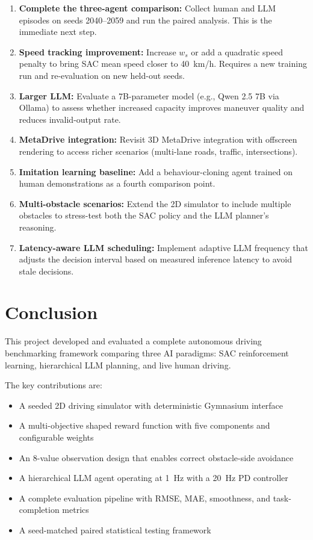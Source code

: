 \documentclass[12pt,a4paper]{report}
\begin{document}
\begin{enumerate}
  \item \textbf{Complete the three-agent comparison:} Collect human and LLM episodes on seeds 2040--2059 and run the paired analysis. This is the immediate next step.

  \item \textbf{Speed tracking improvement:} Increase $w_s$ or add a quadratic speed penalty to bring SAC mean speed closer to 40~km/h. Requires a new training run and re-evaluation on new held-out seeds.

  \item \textbf{Larger LLM:} Evaluate a 7B-parameter model (e.g., Qwen 2.5 7B via Ollama) to assess whether increased capacity improves maneuver quality and reduces invalid-output rate.

  \item \textbf{MetaDrive integration:} Revisit 3D MetaDrive integration with offscreen rendering to access richer scenarios (multi-lane roads, traffic, intersections).

  \item \textbf{Imitation learning baseline:} Add a behaviour-cloning agent trained on human demonstrations as a fourth comparison point.

  \item \textbf{Multi-obstacle scenarios:} Extend the 2D simulator to include multiple obstacles to stress-test both the SAC policy and the LLM planner's reasoning.

  \item \textbf{Latency-aware LLM scheduling:} Implement adaptive LLM frequency that adjusts the decision interval based on measured inference latency to avoid stale decisions.
\end{enumerate}

\chapter{Conclusion}

This project developed and evaluated a complete autonomous driving benchmarking framework comparing three AI paradigms: SAC reinforcement learning, hierarchical LLM planning, and live human driving.

The key contributions are:
\begin{itemize}
  \item A seeded 2D driving simulator with deterministic Gymnasium interface
  \item A multi-objective shaped reward function with five components and configurable weights
  \item An 8-value observation design that enables correct obstacle-side avoidance
  \item A hierarchical LLM agent operating at 1~Hz with a 20~Hz PD controller
  \item A complete evaluation pipeline with RMSE, MAE, smoothness, and task-completion metrics
  \item A seed-matched paired statistical testing framework
\end{itemize}
\end{document}
